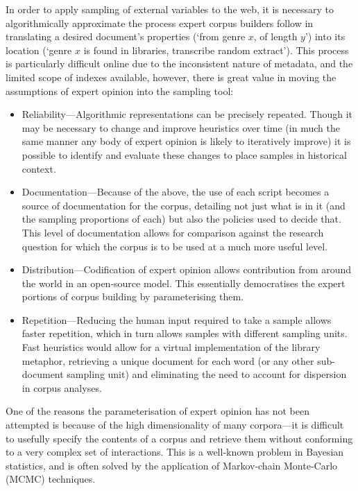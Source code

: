 In order to apply sampling of external variables to the web, it is necessary to algorithmically approximate the process expert corpus builders follow in translating a desired document's properties (`from genre $x$, of length $y$') into its location (`genre $x$ is found in libraries, transcribe random extract').  This process is particularly difficult online due to the inconsistent nature of metadata, and the limited scope of indexes available, however, there is great value in moving the assumptions of expert opinion into the sampling tool:

\begin{itemize}
    \item Reliability---Algorithmic representations can be precisely repeated.  Though it may be necessary to change and improve heuristics over time (in much the same manner any body of expert opinion is likely to iteratively improve) it is possible to identify and evaluate these changes to place samples in historical context.
    \item Documentation---Because of the above, the use of each script becomes a source of documentation for the corpus, detailing not just what is in it (and the sampling proportions of each) but also the policies used to decide that.  This level of documentation allows for comparison against the research question for which the corpus is to be used at a much more useful level.
    \item Distribution---Codification of expert opinion allows contribution from around the world in an open-source model.  This essentially democratises the expert portions of corpus building by parameterising them.
    \item Repetition---Reducing the human input required to take a sample allows faster repetition, which in turn allows samples with different sampling units.  Fast heuristics would allow for a virtual implementation of the library metaphor\cite{evert2006random}, retrieving a unique document for each word (or any other sub-document sampling unit) and eliminating the need to account for dispersion in corpus analyses.
\end{itemize}


One of the reasons the parameterisation of expert opinion has not been attempted is because of the high dimensionality of many corpora---it is difficult to usefully specify the contents of a corpus and retrieve them without conforming to a very complex set of interactions.  This is a well-known problem in Bayesian statistics, and is often solved by the application of Markov-chain Monte-Carlo (MCMC) techniques.

